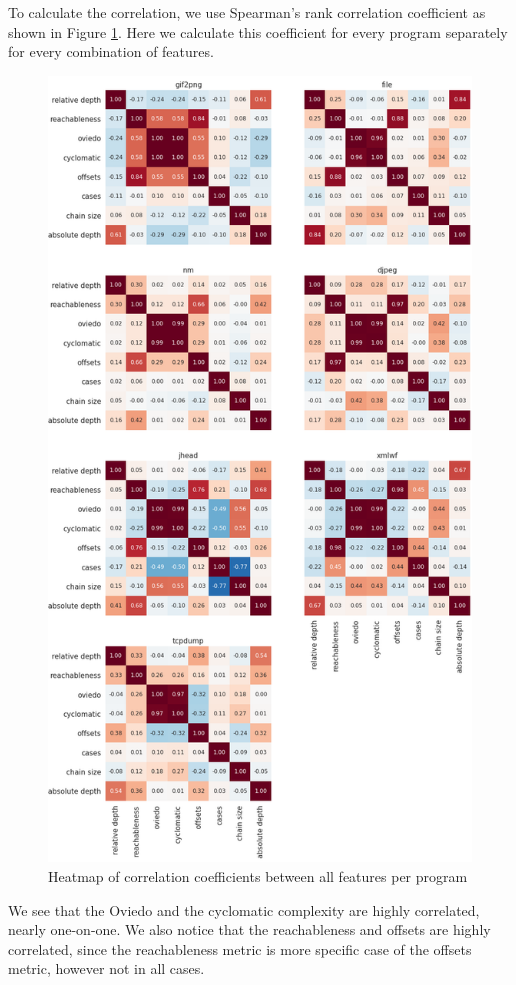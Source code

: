 To calculate the correlation, we use Spearman's rank correlation coefficient \cite{lehman2005jmp} as shown in Figure \ref{fig:correlation}. Here we calculate this coefficient for every program separately for every combination of features.
\begin{figure}[p]
    \centering
    \includegraphics[height=\textheight]{5_results/graphs_new/correlation_benchmarks.png}  
    \caption{Heatmap of correlation coefficients between all features per program}
    \label{fig:correlation}
\end{figure}
We see that the Oviedo and the cyclomatic complexity are highly correlated, nearly one-on-one. We also notice that the reachableness and offsets are highly correlated, since the reachableness metric is more specific case of the offsets metric, however not in all cases.

